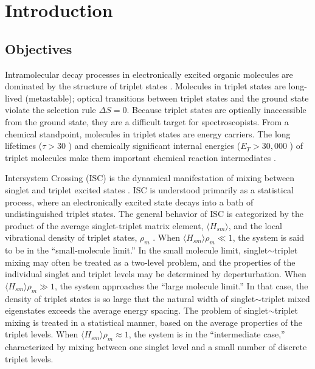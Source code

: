 % 

\chapter{Introduction}
\label{chapter:intro}

\section{Objectives}

Intramolecular decay processes in electronically excited organic
molecules are dominated by the structure of triplet states
\cite{mcglynn69, medvedev95}.  Molecules in triplet states are
long-lived (metastable); optical transitions between triplet states
and the ground state violate the selection rule $\Delta S = 0$.
Because triplet states are optically inaccessible from the ground
state, they are a difficult target for spectroscopists.  From a
chemical standpoint, molecules in triplet states are energy carriers.
The long lifetimes ($\tau > 30$ \microsec) and chemically significant
internal energies ($E_T > 30,000$ \rcm) of triplet molecules make them
important chemical reaction intermediates \cite{calvert66}.

Intersystem Crossing (ISC) is the dynamical manifestation of mixing
between singlet and triplet excited states \cite{robinson67,
  kommandeur87, lombardi88, tramer05}.  ISC is understood primarily as
a statistical process, where an electronically excited state decays
into a bath of undistinguished triplet states.  The general behavior
of ISC is categorized by the product of the average singlet-triplet
matrix element, $\langle H_{sm} \rangle$, and the local vibrational
density of triplet states, $\rho_m$ \cite{robinson67, kommandeur87,
  freed76}.  When $\langle H_{sm} \rangle \rho_m \ll 1$, the system is
said to be in the ``small-molecule limit.''  In the small molecule
limit, singlet$\sim$triplet mixing may often be treated as a two-level
problem, and the properties of the individual singlet and triplet
levels may be determined by deperturbation.  When $\langle H_{sm}
\rangle \rho_m \gg 1$, the system approaches the ``large molecule
limit.''  In that case, the density of triplet states is so large that
the natural width of singlet$\sim$triplet mixed eigenstates exceeds
the average energy spacing.  The problem of singlet$\sim$triplet
mixing is treated in a statistical manner, based on the average
properties of the triplet levels.  When $\langle H_{sm} \rangle \rho_m
\approx 1$, the system is in the ``intermediate case,'' characterized
by mixing between one singlet level and a small number of discrete
triplet levels.

